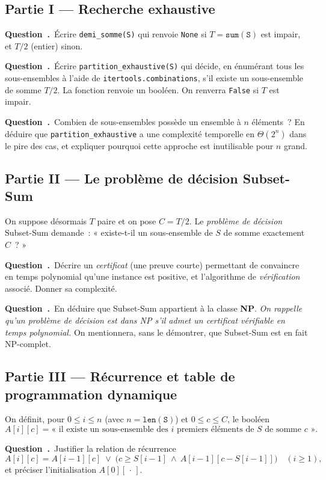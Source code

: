 \documentclass[11pt,a4paper]{article}
\newcounter{qcnt}
\newcommand{\Q}{\medskip\par\stepcounter{qcnt}\noindent\textbf{Question~\theqcnt.}~}
\newcommand{\code}[1]{\lstinline!#1!}
\begin{document}
\medskip
\subsection*{Partie I --- Recherche exhaustive}

\Q Écrire \code{demi_somme(S)} qui renvoie \code{None} si $T=\mathtt{sum(S)}$ est impair, et
$T/2$ (entier) sinon.

\Q Écrire \code{partition_exhaustive(S)} qui décide, en énumérant tous les sous-ensembles à l'aide
de \code{itertools.combinations}, s'il existe un sous-ensemble de somme $T/2$. La fonction renvoie
un booléen. On renverra \code{False} si $T$ est impair.

\Q Combien de sous-ensembles possède un ensemble à $n$ éléments~? En déduire que
\code{partition_exhaustive} a une complexité temporelle en $\Theta(2^{n})$ dans le pire des cas,
et expliquer pourquoi cette approche est inutilisable pour $n$ grand.

\subsection*{Partie II --- Le problème de décision Subset-Sum}

On suppose désormais $T$ paire et on pose $C = T/2$. Le \emph{problème de décision} Subset-Sum
demande~: « existe-t-il un sous-ensemble de $S$ de somme exactement $C$~? »

\Q Décrire un \emph{certificat} (une preuve courte) permettant de convaincre en temps polynomial
qu'une instance est positive, et l'algorithme de \emph{vérification} associé. Donner sa complexité.

\Q En déduire que Subset-Sum appartient à la classe \textbf{NP}. \emph{On rappelle qu'un problème
de décision est dans NP s'il admet un certificat vérifiable en temps polynomial.} On mentionnera,
sans le démontrer, que Subset-Sum est en fait NP-complet.

\subsection*{Partie III --- Récurrence et table de programmation dynamique}

On définit, pour $0 \le i \le n$ (avec $n=\mathtt{len(S)}$) et $0 \le c \le C$, le booléen
$$A[i][c] = \text{« il existe un sous-ensemble des } i \text{ premiers éléments de } S
\text{ de somme } c \text{ »}.$$

\Q Justifier la relation de récurrence
$$A[i][c] = A[i-1][c] \;\lor\; \bigl(c \ge S[i-1] \ \land\ A[i-1][c - S[i-1]]\bigr)
\quad (i \ge 1),$$
et préciser l'initialisation $A[0][\,\cdot\,]$.
\end{document}
